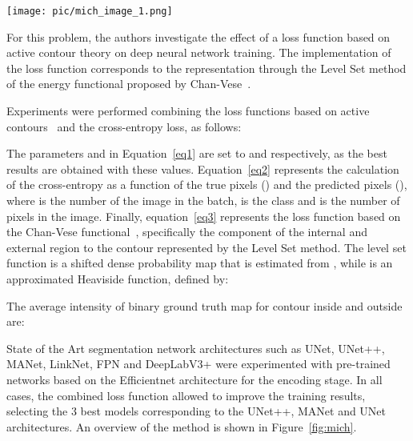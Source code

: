 \documentclass[twocolumn]{article}
\newcommand{\PUCP}[0]{PUCP}\newcommand{\HCMUS}[0]{HCMUS}\newcommand{\baseline}[0]{Baseline}
\begin{document}
\begin{figure*}[t]
\centering
\texttt{[image: pic/mich\_image\_1.png]}
\caption{Overview of the \PUCP{} method}
\label{fig:mich}
\end{figure*}

For this problem, the authors investigate the effect of a loss function  based on active contour theory on deep neural network training. The implementation of the loss function corresponds to the representation through the Level Set method of the energy functional proposed by Chan-Vese~\cite{mich_1}. 

Experiments were performed combining the loss functions based on active contours~\cite{mich_2,mich_3,mich_4} and the cross-entropy loss, as follows:




The parameters  and  in Equation~\ref{eq1} are set to  and  respectively, as the best results are obtained with these values. Equation~\ref{eq2} represents the calculation of the cross-entropy as a function of the true pixels () and the predicted pixels (), where  is the number of the image in the batch,  is the class and  is the number of pixels in the image. Finally, equation~\ref{eq3} represents the loss function based on the Chan-Vese functional~\cite{mich_1}, specifically the component of the internal and external region to the contour represented by the Level Set method.
\color{black}
The level set function  is a shifted dense probability map that is estimated from , while  is an approximated Heaviside function, defined by: 

The average intensity of binary ground truth map  for contour inside and outside are:



State of the Art segmentation network architectures such as UNet, UNet++, MANet, LinkNet, FPN and DeepLabV3+ were experimented with pre-trained networks based on the Efficientnet architecture for the encoding stage. In all cases, the combined loss function allowed to improve the training results, selecting the 3 best models corresponding to the UNet++, MANet and UNet architectures. An overview of the method is shown in Figure~\ref{fig:mich}.
\end{document}
